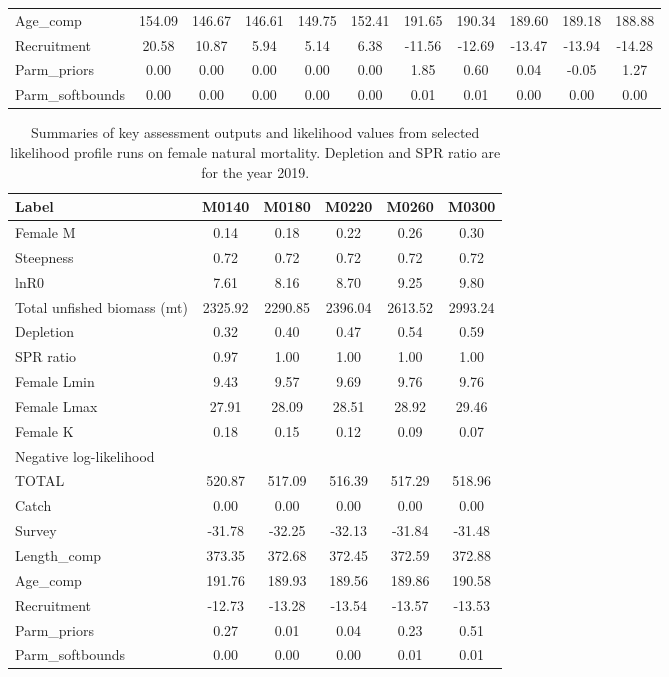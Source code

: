\documentclass[12pt,]{article}
\begin{document}
\begin{landscape}
\begin{table}[ht]
\begin{tabular}{l|ccccc|ccccc}
  Age\_comp & 154.09 & 146.67 & 146.61 & 149.75 & 152.41 & 191.65 & 190.34 & 189.60 & 189.18 & 188.88 \\ 
  Recruitment & 20.58 & 10.87 & 5.94 & 5.14 & 6.38 & -11.56 & -12.69 & -13.47 & -13.94 & -14.28 \\ 
  Parm\_priors & 0.00 & 0.00 & 0.00 & 0.00 & 0.00 & 1.85 & 0.60 & 0.04 & -0.05 & 1.27 \\ 
  Parm\_softbounds & 0.00 & 0.00 & 0.00 & 0.00 & 0.00 & 0.01 & 0.01 & 0.00 & 0.00 & 0.00 \\ 
   \hline
\end{tabular}
\end{table}
\begin{table}[ht]
\centering
\caption{Summaries of key assessment outputs 
                                              and likelihood values from selected 
                                              likelihood profile runs on female 
                                              natural mortality.  Depletion and SPR ratio 
                                              are for the year 2019.} 
\label{tab:like_profiles2}
\begin{tabular}{l|ccccc}
  \hline
Label & M0140 & M0180 & M0220 & M0260 & M0300 \\ 
  \hline
Female M & 0.14 & 0.18 & 0.22 & 0.26 & 0.30 \\ 
  Steepness & 0.72 & 0.72 & 0.72 & 0.72 & 0.72 \\ 
  lnR0 & 7.61 & 8.16 & 8.70 & 9.25 & 9.80 \\ 
  Total unfished biomass (mt) & 2325.92 & 2290.85 & 2396.04 & 2613.52 & 2993.24 \\ 
  Depletion & 0.32 & 0.40 & 0.47 & 0.54 & 0.59 \\ 
  SPR ratio & 0.97 & 1.00 & 1.00 & 1.00 & 1.00 \\ 
  Female Lmin & 9.43 & 9.57 & 9.69 & 9.76 & 9.76 \\ 
  Female Lmax & 27.91 & 28.09 & 28.51 & 28.92 & 29.46 \\ 
  Female K & 0.18 & 0.15 & 0.12 & 0.09 & 0.07 \\ 
  Negative log-likelihood &  &  &  &  &  \\ 
  TOTAL & 520.87 & 517.09 & 516.39 & 517.29 & 518.96 \\ 
  Catch & 0.00 & 0.00 & 0.00 & 0.00 & 0.00 \\ 
  Survey & -31.78 & -32.25 & -32.13 & -31.84 & -31.48 \\ 
  Length\_comp & 373.35 & 372.68 & 372.45 & 372.59 & 372.88 \\ 
  Age\_comp & 191.76 & 189.93 & 189.56 & 189.86 & 190.58 \\ 
  Recruitment & -12.73 & -13.28 & -13.54 & -13.57 & -13.53 \\ 
  Parm\_priors & 0.27 & 0.01 & 0.04 & 0.23 & 0.51 \\ 
  Parm\_softbounds & 0.00 & 0.00 & 0.00 & 0.01 & 0.01 \\ 
   \hline
\end{tabular}
\end{table}

\end{landscape}
\end{document}
